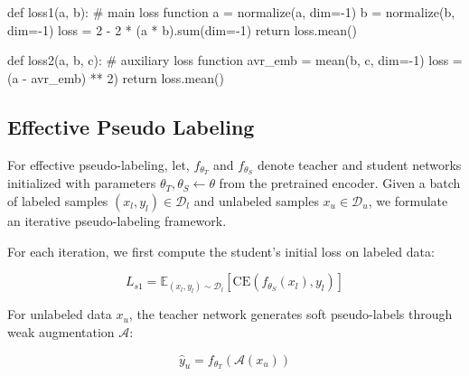 \begin{algorithm}[!htbp]
\begin{algorithmic}

\State \text{}

\State \textcolor{pythonfunction}{def} loss1(a, b):  \textcolor{pythoncomment}{\# main loss function}
\State \hspace{1.1em} a = normalize(a, dim=-1)
\State \hspace{1.1em} b = normalize(b, dim=-1)
\State \hspace{1.1em} loss = 2 - 2 * (a * b).\textcolor{pythonfunction}{sum}(dim=-1) 
\State \hspace{1.1em} \textcolor{pythonfunction}{return} loss.mean()


\State \textcolor{pythonfunction}{def} loss2(a, b, c): \textcolor{pythoncomment}{\# auxiliary loss function}
\State \hspace{1.1em}	avr\_emb = mean(b, c, dim=-1)
\State \hspace{1.1em} loss = (a - avr\_emb) ** 2)
\State \hspace{1.1em} \textcolor{pythonfunction}{return} loss.mean()
\end{algorithmic}
\end{algorithm}

\subsection{Effective Pseudo Labeling}  

For effective pseudo-labeling, let, $f_{\theta_T}$ and $f_{\theta_S}$ denote teacher and student networks initialized with parameters $\theta_T, \theta_S \leftarrow \theta$ from the pretrained encoder. Given a batch of labeled samples $(x_l, y_l) \in \mathcal{D}_l$ and unlabeled samples $x_u \in \mathcal{D}_u$, we formulate an iterative pseudo-labeling framework.

For each iteration, we first compute the student's initial loss on labeled data:

\begin{equation}
L_{s1} = \mathbb{E}_{(x_l,y_l)\sim\mathcal{D}_l}[\text{CE}(f_{\theta_S}(x_l), y_l)]
\end{equation}

For unlabeled data $x_u$, the teacher network generates soft pseudo-labels through weak augmentation $\mathcal{A}$:

\begin{equation}
\hat{y}_u = f_{\theta_T}(\mathcal{A}(x_u))
\end{equation}

